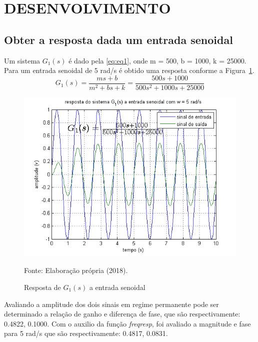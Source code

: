 \section{DESENVOLVIMENTO}

\subsection{Obter a resposta dada um entrada senoidal}

Um sistema $G_1(s)$ é dado pela \autoref{eq:eq1}, onde m = 500, b = 1000, k = 25000. Para um entrada senoidal de 5 rad/s é obtido uma resposta conforme a Figura~\ref{fig:f1}.
\\
\begin{equation}
    G_1(s) = \frac{ms + b}{m^{2} + bs + k} = \frac{500s + 1000}{500s^{2} + 1000s + 25000}
    \label{eq:eq1}
\end{equation}

\begin{figure}[h!]
    \centering
    \caption{Resposta de $G_1(s)$ a entrada senoidal}
    \includegraphics[scale=0.55]{img/task_7_01.png}
    \label{fig:f1}
    \begin{flushleft}
    Fonte: Elaboração própria (2018).
    \end{flushleft}
\end{figure}

Avaliando a amplitude dos dois sinais em regime permanente pode ser determinado a relação de ganho e diferença de fase, que são respectivamente: 0.4822, 0.1000.
Com o auxilio da função \textit{freqresp}, foi avaliado a magnitude e fase para 5 rad/s que são respectivamente: 0.4817, 0.0831.

